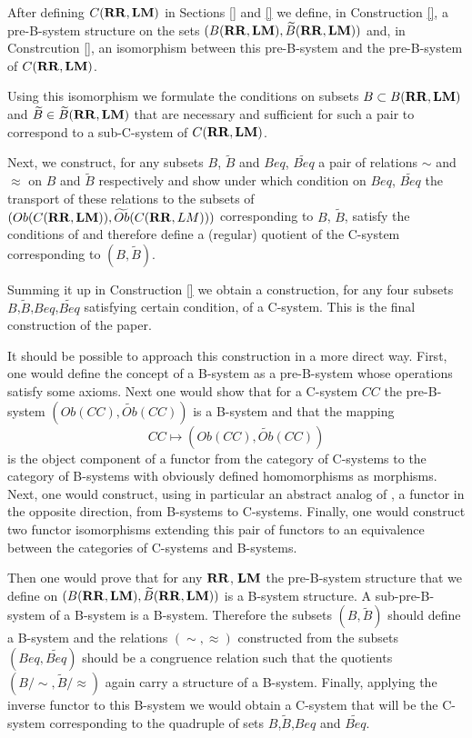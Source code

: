 \documentclass[12pt]{amsart}
\newcommand{\wt}{\widetilde}
\newcommand{\RR}{{\bf RR}}
\newcommand{\LM}{{\bf LM}}
\begin{document}
After defining $C(\RR,\LM)$ in Sections \ref{} and \ref{} 
we define, in Construction \ref{}, a pre-B-system structure on the sets $(B(\RR,\LM),\wt{B}(\RR,\LM))$ and, in Constrcution \ref{}, an isomorphism between this pre-B-system and the pre-B-system of $C(\RR,\LM)$. 

Using this isomorphism we formulate the conditions on subsets $B\subset B(\RR,\LM)$ and $\wt{B}\in \wt{B}(\RR,\LM)$ that are necessary and sufficient for such a pair to correspond to a sub-C-system of $C(\RR,\LM)$.

Next, we construct, for any subsets $B$, $\wt{B}$ and $Beq$, $\wt{Beq}$ a pair of relations $\sim$ and $\approx$ on $B$ and $\wt{B}$ respectively and show under which condition on $Beq$, $\wt{Beq}$ the transport of these relations to the subsets of $(Ob(C(\RR,\LM)),\wt{Ob}(C(\RR,LM)))$ corresponding to $B$, $\wt{B}$, satisfy the conditions of \cite[Prop. 5.4]{Csubsystems} and therefore define a (regular) quotient of the C-system corresponding to $(B,\wt{B})$.

Summing it up in Construction \ref{} we obtain a construction, for any four subsets $B$,$\wt{B}$,$Beq$,$\wt{Beq}$ satisfying certain condition, of a C-system. This is the final construction of the paper.

It should be possible to approach this construction in a more direct way. First, one would define the concept of a B-system as a pre-B-system whose operations satisfy some axioms. Next one would show that for a C-system $CC$ the pre-B-system $(Ob(CC),\wt{Ob}(CC))$ is a B-system and that the mapping 
%
$$CC\mapsto (Ob(CC),\wt{Ob}(CC))$$
%
is the object component of a functor from the category of C-systems to the category of B-systems with obviously defined homomorphisms as morphisms. Next, one would construct, using in particular an abstract analog of \cite[Def. 2.11]{Hofmann}, a functor in the opposite direction, from B-systems to C-systems. Finally, one would construct two functor isomorphisms extending this pair of functors to an equivalence between the categories of C-systems and B-systems. 

Then one would prove that for any $\RR$, $\LM$ the pre-B-system structure that we define on $(B(\RR,\LM),\wt{B}(\RR,\LM))$ is a B-system structure. A sub-pre-B-system of a B-system is a B-system. Therefore the subsets $(B,\wt{B})$ should define a B-system and the relations $(\sim,\approx)$ constructed from the subsets $(Beq,\wt{Beq})$ should be a congruence relation such that the quotients $(B/\sim,\wt{B}/\approx)$ again carry a structure of a B-system. Finally, applying the inverse functor to this B-system we would obtain a C-system that will be the C-system corresponding to the quadruple of sets $B$,$\wt{B}$,$Beq$ and $\wt{Beq}$. 
\end{document}
